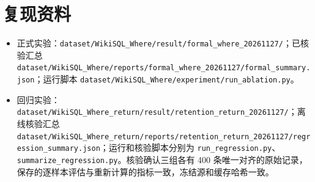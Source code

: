 \documentclass[conference]{IEEEtran}
\begin{document}
\section*{复现资料}
\begin{itemize}
\item \raggedright 正式实验：\texttt{dataset/\allowbreak{}WikiSQL\_Where/\allowbreak{}result/\allowbreak{}formal\_where\_20261127/\allowbreak{}}；已核验汇总 \texttt{dataset/\allowbreak{}WikiSQL\_Where/\allowbreak{}reports/\allowbreak{}formal\_where\_20261127/\allowbreak{}formal\_summary.json}；运行脚本 \texttt{dataset/\allowbreak{}WikiSQL\_Where/\allowbreak{}experiment/\allowbreak{}run\_ablation.py}。
\item \raggedright 回归实验：\texttt{dataset/\allowbreak{}WikiSQL\_Where\_return/\allowbreak{}result/\allowbreak{}retention\_return\_20261127/\allowbreak{}}；离线核验汇总 \texttt{dataset/\allowbreak{}WikiSQL\_Where\_return/\allowbreak{}reports/\allowbreak{}retention\_return\_20261127/\allowbreak{}regression\_summary.json}；运行和核验脚本分别为 \texttt{run\_regression.py}、\texttt{summarize\_regression.py}。核验确认三组各有 400 条唯一对齐的原始记录，保存的逐样本评估与重新计算的指标一致，冻结源和缓存哈希一致。
\end{itemize}
\end{document}
